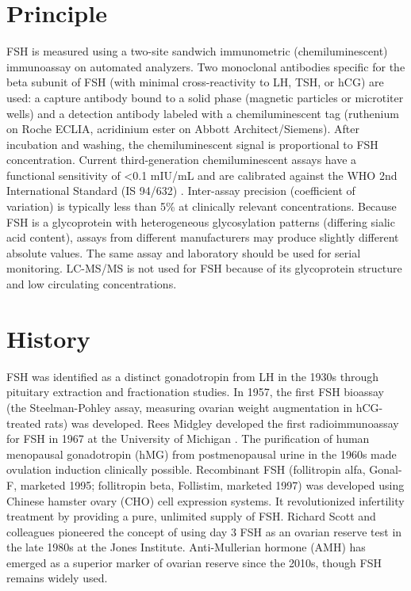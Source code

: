 \section*{Principle}
FSH is measured using a two-site sandwich immunometric (chemiluminescent) immunoassay on automated analyzers. Two monoclonal antibodies specific for the beta subunit of FSH (with minimal cross-reactivity to LH, TSH, or hCG) are used: a capture antibody bound to a solid phase (magnetic particles or microtiter wells) and a detection antibody labeled with a chemiluminescent tag (ruthenium on Roche ECLIA, acridinium ester on Abbott Architect/Siemens). After incubation and washing, the chemiluminescent signal is proportional to FSH concentration. Current third-generation chemiluminescent assays have a functional sensitivity of <0.1 mIU/mL and are calibrated against the WHO 2nd International Standard (IS 94/632) \cite{tietz2023textbook}. Inter-assay precision (coefficient of variation) is typically less than 5\% at clinically relevant concentrations. Because FSH is a glycoprotein with heterogeneous glycosylation patterns (differing sialic acid content), assays from different manufacturers may produce slightly different absolute values. The same assay and laboratory should be used for serial monitoring. LC-MS/MS is not used for FSH because of its glycoprotein structure and low circulating concentrations.

\section*{History}
FSH was identified as a distinct gonadotropin from LH in the 1930s through pituitary extraction and fractionation studies. In 1957, the first FSH bioassay (the Steelman-Pohley assay, measuring ovarian weight augmentation in hCG-treated rats) was developed. Rees Midgley developed the first radioimmunoassay for FSH in 1967 at the University of Michigan \cite{midgley1967radioimmunoassay}. The purification of human menopausal gonadotropin (hMG) from postmenopausal urine in the 1960s made ovulation induction clinically possible. Recombinant FSH (follitropin alfa, Gonal-F, marketed 1995; follitropin beta, Follistim, marketed 1997) was developed using Chinese hamster ovary (CHO) cell expression systems. It revolutionized infertility treatment by providing a pure, unlimited supply of FSH. Richard Scott and colleagues pioneered the concept of using day 3 FSH as an ovarian reserve test in the late 1980s at the Jones Institute. Anti-Mullerian hormone (AMH) has emerged as a superior marker of ovarian reserve since the 2010s, though FSH remains widely used.

